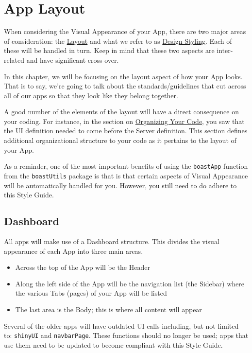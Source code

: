 \documentclass[
]{book}
\providecommand{\tightlist}{%
  \setlength{\itemsep}{0pt}\setlength{\parskip}{0pt}}
\begin{document}
\hypertarget{layout}{%
\chapter{App Layout}\label{layout}}

When considering the Visual Appearance of your App, there are two major areas of consideration: the \protect\hyperlink{layout}{Layout} and what we refer to as \protect\hyperlink{designStyle}{Design Styling}. Each of these will be handled in turn. Keep in mind that these two aspects are inter-related and have significant cross-over.

In this chapter, we will be focusing on the layout aspect of how your App looks. That is to say, we're going to talk about the standards/guidelines that cut across all of our apps so that they look like they belong together.

A good number of the elements of the layout will have a direct consequence on your coding. For instance, in the section on \protect\hyperlink{orgCode}{Organizing Your Code}, you saw that the UI definition needed to come before the Server definition. This section defines additional organizational structure to your code as it pertains to the layout of your App.

As a reminder, one of the most important benefits of using the \texttt{boastApp} function from the \texttt{boastUtils} package is that is that certain aspects of Visual Appearance will be automatically handled for you. However, you still need to do adhere to this Style Guide.

\hypertarget{dashboard}{%
\section{Dashboard}\label{dashboard}}

All apps will make use of a Dashboard structure. This divides the visual appearance of each App into three main areas.

\begin{itemize}
\tightlist
\item
  Across the top of the App will be the Header
\item
  Along the left side of the App will be the navigation list (the Sidebar) where the various Tabs (pages) of your App will be listed
\item
  The last area is the Body; this is where all content will appear
\end{itemize}

Several of the older apps will have outdated UI calls including, but not limited to: \texttt{shinyUI} and \texttt{navbarPage}. These functions should no longer be used; apps that use them need to be updated to become compliant with this Style Guide.
\end{document}
